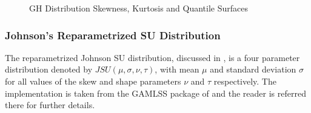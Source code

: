 \begin{landscape}
\begin{figure}[!ht]
\caption[GH Distribution Skewness, Kurtosis and Quantile Surfaces]{GH Distribution Skewness, Kurtosis and Quantile Surfaces}\label{fig:ghsurface}
\end{figure}
\end{landscape}

\subsubsection{Johnson's Reparametrized SU Distribution}\label{jsu}
The reparametrized Johnson SU distribution, discussed in \citet{Rigby1}, is a
four parameter distribution denoted by $JSU\left(\mu,\sigma,\nu,\tau\right)$,
with mean $\mu$ and standard deviation $\sigma$ for all values of the skew and
shape parameters $\nu$ and $\tau$ respectively. The implementation is taken
from the GAMLSS package of \citet{Rigby1} and the reader is referred there for
further details.

